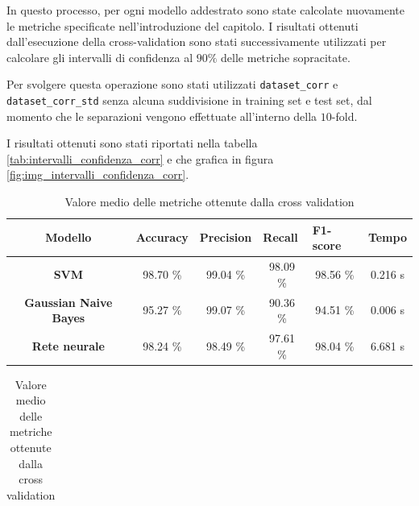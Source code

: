 In questo processo, per ogni modello addestrato sono state calcolate nuovamente
le metriche specificate nell'introduzione del capitolo. I risultati ottenuti
dall'esecuzione della cross-validation sono stati successivamente utilizzati per
calcolare gli intervalli di confidenza al $90\%$ delle metriche sopracitate.

Per svolgere questa operazione sono stati utilizzati \texttt{dataset\_corr} e
\texttt{dataset\_corr\_std} senza alcuna suddivisione in training set e test set,
dal momento che le separazioni vengono effettuate all'interno della $10$-fold.

I risultati ottenuti sono stati riportati nella tabella \ref{tab:intervalli_confidenza_corr}
e che grafica in figura \ref{fig:img_intervalli_confidenza_corr}.
\begin{table}[!ht]
    \begin{subtable}[h]{1\textwidth}
        \centering
        \begin{tabular}{@{}clllll@{}}
            \toprule
            \rowcolor[HTML]{EFEFEF}
            \textbf{Modello}                                      & \textbf{Accuracy}            & \textbf{Precision}           & \textbf{Recall}              & \textbf{F1-score}            & \textbf{Tempo}              \\ \midrule
            \cellcolor[HTML]{EFEFEF}\textbf{SVM}                  & \multicolumn{1}{c}{98.70 \%} & \multicolumn{1}{c}{99.04 \%} & \multicolumn{1}{c}{98.09 \%} & \multicolumn{1}{c}{98.56 \%} & \multicolumn{1}{c}{0.216 s} \\
            \cellcolor[HTML]{EFEFEF}\textbf{Gaussian Naive Bayes} & \multicolumn{1}{c}{95.27 \%} & \multicolumn{1}{c}{99.07 \%} & \multicolumn{1}{c}{90.36 \%} & \multicolumn{1}{c}{94.51 \%} & \multicolumn{1}{c}{0.006 s} \\
            \cellcolor[HTML]{EFEFEF}\textbf{Rete neurale}         & \multicolumn{1}{c}{98.24 \%} & \multicolumn{1}{c}{98.49 \%} & \multicolumn{1}{c}{97.61 \%} & \multicolumn{1}{c}{98.04 \%} & \multicolumn{1}{c}{6.681 s} \\ \bottomrule
        \end{tabular}
        \caption{Valore medio delle metriche ottenute dalla cross validation}
        \label{tab:risultati_cross_val_corr}
    \end{subtable}
    \hfill
    \begin{subtable}[h]{1\textwidth}
        \centering
        \begin{tabular}{@{}cllll@{}}
            \toprule

\end{tabular}
\end{subtable}
\end{table}
